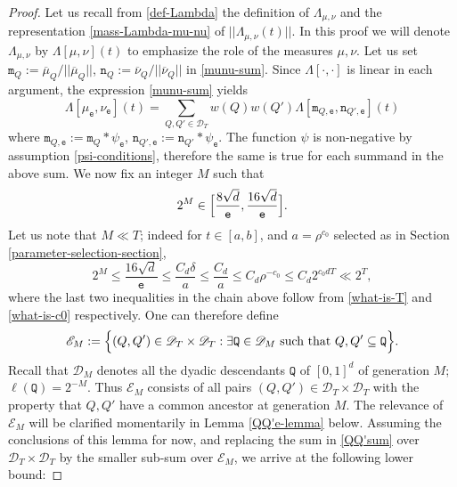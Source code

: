 \documentclass[a4paper,11pt]{amsart}
\numberwithin{equation}{section}
\begin{document}
\begin{proof}
Let us recall from \eqref{def-Lambda} the definition of $\Lambda_{\mu, \nu}$ and the representation \eqref{mass-Lambda-mu-nu} of $||\Lambda_{\mu, \nu}(t)||$. In this proof we will denote $\Lambda_{\mu, \nu}$ by $\Lambda[\mu, \nu](t)$ to emphasize the role of the measures $\mu, \nu$. Let us set $\mathtt m_{Q} := {\overline{\mu}_Q}/{||\overline{\mu}_Q||}$, $\mathtt n_{Q} := {\overline{\nu}_Q}/{||\overline{\nu}_Q||}$ in \eqref{munu-sum}. Since $\Lambda[\cdot, \cdot]$ is linear in each argument, the expression \eqref{munu-sum} yields 
\begin{equation} \Lambda[\mu_{\mathtt e}, \nu_{\mathtt e}](t) =  \sum_{Q, Q' \in \mathscr{D}_T} w(Q) w(Q') \Lambda[\mathtt m_{Q, \mathtt e}, \mathtt n_{Q', \mathtt e}](t) \label{QQ'sum} \end{equation} 
where $\mathtt m_{Q, \mathtt e} := \mathtt m_{Q} \ast \psi_{\mathtt e}$, $\mathtt n_{Q', \mathtt e}:= \mathtt n_{Q'} \ast \psi_{\mathtt e}$. 
The function $\psi$ is non-negative by assumption \eqref{psi-conditions}, therefore the same is true for each summand in the above sum. We now fix an integer $M$ such that
\begin{equation} 
2^M \in \Bigl[\frac{8 \sqrt{d}}{\mathtt e}, \frac{16 \sqrt{d}}{\mathtt e} \Bigr]. \label{choice-of-M}
\end{equation} 
Let us note that $M \ll T$; indeed for $t \in [a, b]$, and $a = \rho^{c_0}$ selected as in Section \ref{parameter-selection-section}, 
\[ 2^M \leq \frac{16 \sqrt{d}}{\mathtt e}\leq \frac{C_d \delta}{a} \leq \frac{C_d}{a} \leq C_d \rho^{-c_0} \leq C_d 2^{c_0dT} \ll 2^{T},  \] 
where the last two inequalities in the chain above follow from \eqref{what-is-T} and \eqref{what-is-c0} respectively. One can therefore define  
\begin{equation} 
\mathscr{E}_M := \Bigl\{(Q, Q') \in \mathscr{D}_T \times \mathscr{D}_T : \exists \mathtt Q \in \mathscr{D}_M \text{ such that } Q, Q' \subseteq \mathtt Q \Bigr\}.
\end{equation}
Recall that $\mathscr{D}_M$ denotes all the dyadic descendants $\mathtt Q$ of $[0,1]^d$ of generation $M$; $\ell(\mathtt Q) = 2^{-M}$. Thus $\mathscr{E}_M$ consists of all pairs $(Q, Q') \in \mathscr{D}_T \times \mathscr{D}_T$ with the property that $Q,Q'$ have a common ancestor at generation $M$. 
\vskip0.1in
\noindent The relevance of $\mathscr{E}_M$ will be clarified momentarily in Lemma \ref{QQ'e-lemma} below. Assuming the conclusions of this lemma for now, and replacing the sum in \eqref{QQ'sum} over $\mathscr{D}_T \times \mathscr{D}_T$ by the smaller sub-sum over $\mathscr{E}_M$, we arrive at the following lower bound:

\end{proof}
\end{document}
